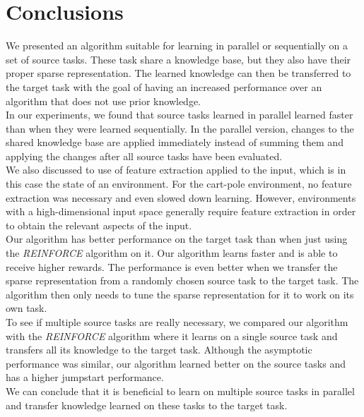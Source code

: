 \chapter{Conclusions}

We presented an algorithm suitable for learning in parallel or sequentially on a set of source tasks.
These task share a knowledge base, but they also have their proper sparse representation.
The learned knowledge can then be transferred to the target task with the goal of having an increased performance over an algorithm that does not use prior knowledge.\\

In our experiments, we found that source tasks learned in parallel learned faster than when they were learned sequentially.
In the parallel version, changes to the shared knowledge base are applied immediately instead of summing them and applying the changes after all source tasks have been evaluated.\\

We also discussed to use of feature extraction applied to the input, which is in this case the state of an environment.
For the cart-pole environment, no feature extraction was necessary and even slowed down learning.
However, environments with a high-dimensional input space generally require feature extraction in order to obtain the relevant aspects of the input.\\

Our algorithm has better performance on the target task than when just using the \textit{REINFORCE} algorithm on it.
Our algorithm learns faster and is able to receive higher rewards.
The performance is even better when we transfer the sparse representation from a randomly chosen source task to the target task.
The algorithm then only needs to tune the sparse representation for it to work on its own task.\\

To see if multiple source tasks are really necessary, we compared our algorithm with the \textit{REINFORCE} algorithm where it learns on a single source task and transfers all its knowledge to the target task.
Although the asymptotic performance was similar, our algorithm learned better on the source tasks and has a higher jumpstart performance.\\

We can conclude that it is beneficial to learn on multiple source tasks in parallel and transfer knowledge learned on these tasks to the target task.

